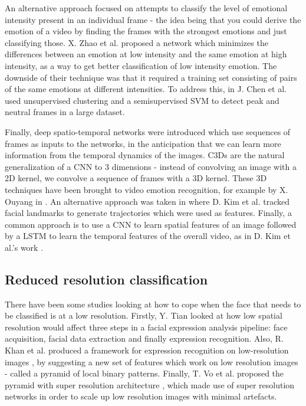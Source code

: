 \documentclass[sigconf]{acmart}
\begin{document}
{An alternative approach focused on attempts to classify the level of
emotional intensity present in an individual frame - the idea being that you
could derive the emotion of a video by finding the frames with the strongest
emotions and just classifying those. 
X. Zhao et al. proposed a network \cite{zhao2016peak} which minimizes the differences
between an emotion at low intensity and the same emotion at high intensity, as
a way to get better classification of low intensity emotion. The downside of
their technique was that it required a training set consisting of pairs of the
same emotions at different intensities. To address this, 
in \cite{chen2018deep} J. Chen et al. used unsupervised clustering and a semisupervised 
SVM to detect peak and neutral frames in a large dataset.

Finally, deep spatio-temporal networks were introduced which use sequences of
frames as inputs to the networks, in the anticipation that we can learn more
information from the temporal dynamics of the images. C3Ds
\cite{tran2015learning} are the natural generalization of a CNN to 3
dimensions - instead of convolving an image with a 2D kernel, we convolve a
sequence of frames with a 3D kernel. These 3D techniques have been brought to
video emotion recognition, for example by X. Ouyang in \cite{ouyang2017audio}.
An alternative approach was taken in \cite{kim2017multi} where D. Kim et al.
tracked facial landmarks to generate trajectories which were used as features.
Finally, a common approach is to use a CNN to learn spatial features of an
image followed by a LSTM to learn the temporal features of the overall video,
as in D. Kim et al.'s work \cite{kim2017multiobjective}.

\subsection{Reduced resolution classification}

There have been some studies looking at how to cope when the face that
needs to be classified is at a low resolution. Firstly, Y. Tian
\cite{tian2004evaluation} looked at how low spatial resolution would affect
three steps in a facial expression analysis pipeline: face acquisition,
facial data extraction and finally expression recognition. Also, R. Khan et
al. produced a framework for expression recognition on low-resolution images
\cite{khan2013framework}, by suggesting a new set of features which work on
low resolution images - called a pyramid of local binary patterns. Finally, T.
Vo et al. proposed the pyramid with super resolution architecture
\cite{vo2020pyramid}, which made use of super resolution networks in order to
scale up low resolution images with minimal artefacts. 



}
\end{document}
